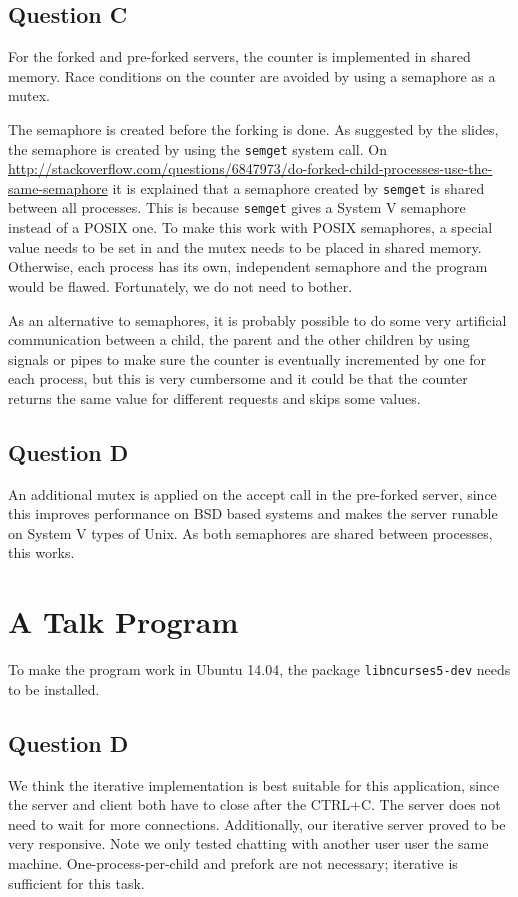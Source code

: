 \documentclass[11pt]{article}
\begin{document}
\subsection{Question C}

For the forked and pre-forked servers, the counter is implemented in shared memory. Race conditions on the counter are avoided by using a semaphore as a mutex.

The semaphore is created before the forking is done. As suggested by the slides, the semaphore is created by using the \texttt{semget} system call. On \url{http://stackoverflow.com/questions/6847973/do-forked-child-processes-use-the-same-semaphore} it is explained that a semaphore created by \texttt{semget} is shared between all processes. This is because \texttt{semget} gives a System V semaphore instead of a POSIX one. To make this work with POSIX semaphores, a special value needs to be set in and the mutex needs to be placed in shared memory. Otherwise, each process has its own, independent semaphore and the program would be flawed. Fortunately, we do not need to bother.

As an alternative to semaphores, it is probably possible to do some very artificial communication between a child, the parent and the other children by using signals or pipes to make sure the counter is eventually incremented by one for each process, but this is very cumbersome and it could be that the counter returns the same value for different requests and skips some values.

\subsection{Question D}

An additional mutex is applied on the accept call in the pre-forked server, since this improves performance on BSD based systems and makes the server runable on System V types of Unix. As both semaphores are shared between processes, this works.

\section{A Talk Program}

To make the program work in Ubuntu 14.04, the package \texttt{libncurses5-dev} needs to be installed.

\subsection{Question D}
We think the iterative implementation is best suitable for this application, since the server and client both have to close after the CTRL+C. The server does not need to wait for more connections. Additionally, our iterative server proved to be very responsive. Note we only tested chatting with another user user the same machine. One-process-per-child and prefork are not necessary; iterative is sufficient for this task.
\end{document}
